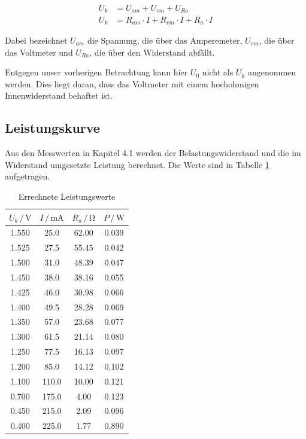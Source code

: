 \begin{align*}
U_k &= U_{am} + U_{vm} + U_{Ra}\\
U_k &= R_{am}\cdot I + R_{vm}\cdot I + R_a\cdot I  
\end{align*}

Dabei bezeichnet $U_{am}$ die Spannung, die über das Amperemeter,
$U_{vm}$, die über das Voltmeter und $U_{Ra}$, die über den Widerstand
abfällt.

Entgegen unser vorherigen Betrachtung kann hier $U_0$ nicht als $U_k$
angenommen werden. Dies liegt daran, dass das Voltmeter mit einem 
hochohmigen Innenwiderstand behaftet ist.

\subsection{Leistungskurve}

Aus den Messwerten in Kapitel 4.1 werden der Belastungswiderstand und 
die im Widerstand umgesetzte Leistung berechnet. Die Werte sind in 
Tabelle \ref{tab:Leistung} aufgetragen.

\begin{table}
   \centering
   \caption{Errechnete Leistungswerte}
   \label{tab:Leistung}
   \begin{tabular}{c c c c}
     \toprule
      $U_k \,/\, \si{\volt}$ & $I \,/\, \si{\milli\ampere}$ & $R_a \,/\, \si{\ohm}$ & $P \,/\, \si{\watt}$\\
     \midrule
      1.550 &  25.0 & 62.00 & 0.039\\
      1.525 &  27.5 & 55.45 & 0.042\\
      1.500 &  31.0 & 48.39 & 0.047\\
      1.450 &  38.0 & 38.16 & 0.055\\
      1.425 &  46.0 & 30.98 & 0.066\\
      1.400 &  49.5 & 28.28 & 0.069\\
      1.350 &  57.0 & 23.68 & 0.077\\
      1.300 &  61.5 & 21.14 & 0.080\\
      1.250 &  77.5 & 16.13 & 0.097\\
      1.200 &  85.0 & 14.12 & 0.102\\
      1.100 & 110.0 & 10.00 & 0.121\\
      0.700 & 175.0 &  4.00 & 0.123\\
      0.450 & 215.0 &  2.09 & 0.096\\
      0.400 & 225.0 &  1.77 & 0.890\\
     \bottomrule
   \end{tabular}
 \end{table}

